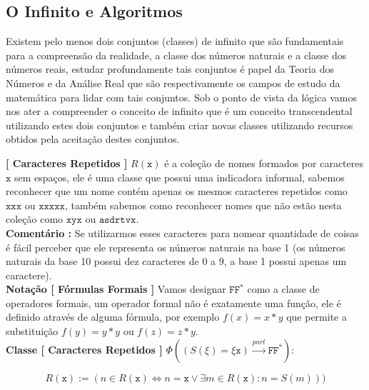 \documentclass[10pt,a4paper]{report}
\begin{document}
\subsection{O Infinito e Algoritmos}

\hspace{\baselineskip}

Existem pelo menos dois conjuntos (classes) de infinito que são fundamentais para a compreensão da realidade, a classe dos números naturais e a classe dos números reais, estudar profundamente tais conjuntos é papel da Teoria dos Números e da Análise Real que são respectivamente os campos de estudo da matemática para lidar com tais conjuntos. Sob o ponto de vista da lógica vamos nos ater a compreender o conceito de infinito que é um conceito transcendental utilizando estes dois conjuntos e também criar novas classes utilizando recursos obtidos pela aceitação destes conjuntos.

\hspace{\baselineskip}

\textbf{[ Caracteres Repetidos ]} $R(\texttt{x})$ é a coleção de nomes formados por caracteres $\texttt{x}$ sem espaços, ele é uma classe que possui uma indicadora informal, sabemos reconhecer que um nome contém apenas os mesmos caracteres repetidos como $\texttt{xxx}$ ou $\texttt{xxxxx}$, também sabemos como reconhecer nomes que não estão nesta coleção como $\texttt{xyx}$ ou $\texttt{asdrtvx}$.\\

\textbf{Comentário :} Se utilizarmos esses caracteres para nomear quantidade de coisas é fácil perceber que ele representa os números naturais na base 1 (os números naturais da base 10 possui dez caracteres de 0 a 9, a base 1 possui apenas um caractere).\\

\textbf{Notação [ Fórmulas Formais ]} Vamos designar $ \texttt{FF}^* $ como a classe de operadores formais, um operador formal não é exatamente uma função, ele é definido através de alguma fórmula, por exemplo $ f(x) = x*y $ que permite a substituição $f(y) = y*y$ ou $f(z) = z*y$.\\

\textbf{Classe [ Caracteres Repetidos ]} $ \Phi( ( S(\xi) = \xi \texttt{x} ) \overset{part}{\rightarrow} \texttt{FF}^* ) : $

$$R(\texttt{x}) := ( n \in R(\texttt{x}) \iff n = \texttt{x} \vee \exists m \in R(\texttt{x}) : n = S(m) ) )$$
\end{document}
